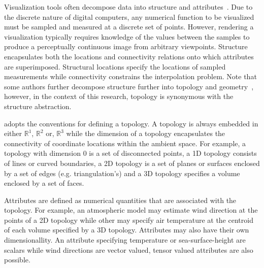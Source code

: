 Visualization tools often decompose data into structure and
attributes~\cite{vtk}. Due to the discrete nature of digital
computers, any numerical function to be visualized must be sampled and
measured at a discrete set of points. However, rendering a
visualization typically requires knowledge of the values between the
samples to produce a perceptually continuous image from arbitrary
viewpoints. Structure encapsulates both the locations and connectivity
relations onto which attributes are superimposed. Structural locations
specify the locations of sampled measurements while connectivity
constrains the interpolation problem. Note that some authors further
decompose structure further into topology and geometry~\cite{weiler},
however, in the context of this research, topology is synonymous with
the structure abstraction.

\sciwms{} adopts the \cfugrid{} conventions for defining a topology. A
topology is always embedded in either $\mathbb{R}^1$, $\mathbb{R}^2$
or, $\mathbb{R}^3$ while the dimension of a topology encapsulates the
connectivity of coordinate locations within the ambient space. For example, a
topology with dimension 0 is a set of disconnected points, a 1D
topology consists of lines or curved boundaries, a 2D topology is a
set of planes or surfaces enclosed by a set of edges
(e.g. triangulation's) and a 3D topology specifies a volume enclosed
by a set of faces.

Attributes are defined as numerical quantities that are associated
with the topology. For example, an atmospheric model may estimate wind
direction at the points of a 2D topology while other may specify air
temperature at the centroid of each volume specified by a 3D
topology. Attributes may also have their own dimensionallity. An
attribute specifying temperature or sea-surface-height are scalars
while wind directions are vector valued, tensor valued attributes are
also possible.

